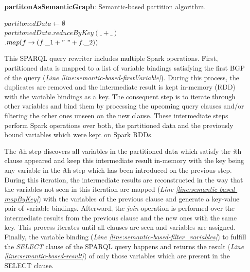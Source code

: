 \begin{algorithm*}
\caption{\textbf{partitonAsSemanticGraph}: Semantic-based partition algorithm.}
\label{alg:semantic-based-partitionGraph}
$partitonedData \leftarrow \emptyset $\\
        $partitonedData.reduceByKey(\_+\_)$\label{line:semantic-based-groupBy}\\
        \quad \quad \quad \quad \quad \quad $.map(f\rightarrow(f.\_1 + "~" + f.\_2))$ \label{line:semantic-based-partitionGraph_map}\\
\end{algorithm*}

This \gls{SPARQL} query rewriter includes multiple Spark operations.
First, partitioned data is mapped to a list of variable bindings satisfying the first \gls{BGP} of the query (\textit{Line \ref{line:semantic-based-firstVariable}}). 
During this process, the duplicates are removed and the intermediate result is kept in-memory (\gls{RDD}) with the variable bindings as a key.
The consequent step is to iterate through other variables and bind them by processing the upcoming query clauses and/or filtering the other ones unseen on the new clause.
These intermediate steps perform Spark operations over both, the partitioned data and the previously bound variables which were kept on Spark \gls{RDD}s.

The \textit{i}th step discovers all variables in the partitioned data which satisfy the \textit{i}th clause appeared and keep this intermediate result in-memory with the key being any variable in the \textit{i}th step which has been introduced on the previous step.
During this iteration, the intermediate results are reconstructed in the way that the variables not seen in this iteration are mapped (\textit{Line \ref{line:semantic-based-mapByKey}}) with the variables of the previous clause and generate a key-value pair of variable bindings.
Afterward, the \emph{join} operation is performed over the intermediate results from the previous clause and the new ones with the same key.
This process iterates until all clauses are seen and variables are assigned.
Finally, the variable binding (\textit{Line \ref{line:semantic-based-filter_variables}}) to fulfill the \emph{SELECT} clause of the \gls{SPARQL} query happens and returns the result (\textit{Line \ref{line:semantic-based-result}}) of only those variables which are present in the SELECT clause.

